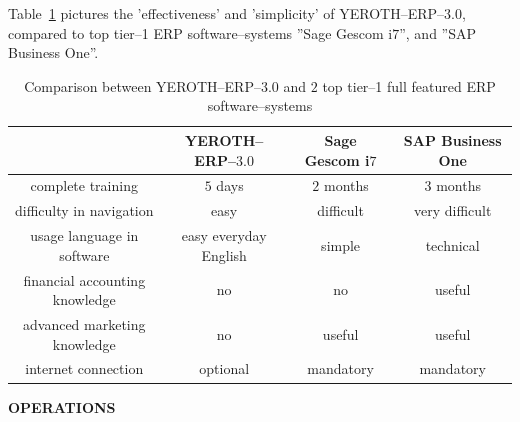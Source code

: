 \documentclass[12pt, a4paper]{article}
\newcommand{\yerotherpblack}{YEROTH--ERP--$3.0$\xspace}
\newcommand{\saperp}{SAP Business One\xspace}
\newcommand{\sageerp}{Sage Gescom i$7$\xspace}
\newcommand{\yerothvert}[1]{\textcolor{yerothColorGreen}{#1}\xspace}
\newcommand{\yerothorange}[1]{\textcolor{yerothColorOrange}{#1}\xspace}
\newcommand{\yerothrouge}[1]{\textcolor{yerothColorRed}{#1}\xspace}
\newcommand{\yerothfacile}{\yerothvert{easy}\xspace}
\newcommand{\yerothdifficile}{\yerothorange{difficult}\xspace}
\newcommand{\yerothtresdifficile}{\yerothrouge{very difficult}\xspace}
\begin{document}
\vspace{0em}

Table~\ref{tab:comparison-against-others-erp-software-systems}
pictures the 'effectiveness' and 'simplicity' of \yerotherpblack, 
compared to top tier--1 ERP software--systems ''\sageerp'',
and ''\saperp''.\\

\vspace{0em}

\begin{table}[!htbp]
\centering
\begin{tabular}{cccc} 

\multicolumn{1}{c}{}			&
\yerotherpblack 				& 
\sageerp						&
\saperp		\\ \hline

complete training					&
		\yerothvert{$5$ days}		&
		\yerothorange{$2$ months}	&						
		\yerothrouge{$3$ months}	\\ \hline

difficulty in navigation			&
		\yerothfacile				&
		\yerothdifficile			&						
		\yerothtresdifficile		\\  \hline
		
usage language in software					&
		\yerothvert{easy everyday English}	&
		\yerothorange{simple}				&						
		\yerothrouge{technical}				\\ \hline			
		
financial accounting knowledge	&
		\yerothvert{no}			&
		\yerothvert{no}			&						
		\yerothorange{useful}	\\ \hline		

advanced marketing knowledge	&
		\yerothvert{no}			&
		\yerothorange{useful}	&						
		\yerothorange{useful}	\\ \hline
		
internet connection				&
		\yerothvert{optional}			&
		\yerothrouge{mandatory}	&						
		\yerothrouge{mandatory}	\\ 
\end{tabular}
\caption{Comparison between \yerotherpblack and $2$ top tier--1
	full featured ERP software--systems\\}
\label{tab:comparison-against-others-erp-software-systems}
\end{table}

\vspace{-0.2em}

{\large \bf OPERATIONS}

\vspace{-0.2em}
\end{document}
